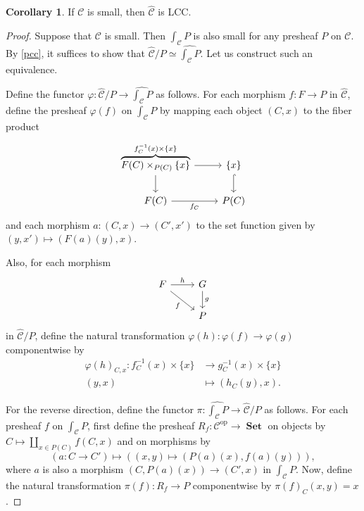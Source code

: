 \documentclass[10pt,letterpaper,cm]{nupset}
\theoremstyle{definition}
\theoremstyle{theorem}
\newtheorem{corollary}[definition]{Corollary}
\theoremstyle{remark}
\newcommand{\0}{\mathbf{0}}
\newcommand{\1}{\mathbf{1}}
\newcommand{\2}{\mathbf{2}}
\DeclareMathOperator{\op}{op}
\DeclareMathOperator{\set}{\mathbf{Set}}
\renewcommand{\c}{\mathscr{C}}
\begin{document}
\begin{corollary}
If $\c$ is small, then $\widehat{\c}$ is LCC.
\end{corollary}
\begin{proof}
Suppose that $\c$ is small. Then $\int_{\c}{P}$ is also small for any presheaf $P$ on $\c$. By \cref{pcc}, it suffices to show that $\widehat{\c}/P \simeq \widehat{\int_{\c}{P}}$. Let us construct such an equivalence.

\medskip

Define the functor $\varphi : \widehat{\c}/P \to \widehat{\int_{\c}{P}}$ as follows. For each morphism $f : F \to P$ in $\widehat{\c}$, define the presheaf $\varphi(f)$ on $\int_{\c}{P}$ by mapping each object $\left(C, x\right)$ to the fiber product  
\[
\begin{tikzcd}
\overbrace{F(C) \times_{P(C)} \{x\}}^{f_C^{-1}(x) \times \{x\}} \arrow[d] \arrow[r] & \{x\} \arrow[d, hook] \\
F(C) \arrow[r, "f_C"']                       & P(C)                 
\end{tikzcd}
\] and each morphism $a: \left(C, x\right) \to \left(C', x'\right)$ to the set function given by $\left(y, x'\right) \mapsto \left(F(a)(y), x\right)$. 

\smallskip

Also, for each morphism 
\[
\begin{tikzcd}
F \arrow[r, "h"] \arrow[rd, "f"'] & G \arrow[d, "g"] \\
                                  & P               
\end{tikzcd}
\] in $\widehat{\c}/P$, define the natural transformation $\varphi(h) : \varphi(f) \to \varphi(g)$ componentwise by 
\begin{align*}
\varphi(h)_{C,x} :  f_C^{-1}(x) \times \{x\} & \to g_C^{-1}(x) \times \{x\}
\\   \left(y,x\right)& \mapsto \left(h_C(y), x\right)
.\end{align*}

\medskip

For the reverse direction, define the functor $\pi :  \widehat{\int_{\c}{P}} \to \widehat{\c}/P$ as follows. For each presheaf $f$ on $\int_{\c}{P}$, first define the presheaf $R_f : \c^{\op} \to \set$ on objects by $C \mapsto \coprod_{x\in P(C)}f(C, x)$ and on morphisms by $$\left(a : C \to C'\right) \mapsto  \left(\left(x, y\right) \mapsto \left(P(a)(x), f(a)(y)\right) \right),$$ where $a$ is also a morphism $\left(C,  P(a)(x)\right) \to \left(C', x\right)$ in $\int_{\c}{P}$. Now, define the natural transformation $\pi(f) : R_f \to P$ componentwise by $\pi(f)_C(x,y) = x$. 


\end{proof}
\end{document}
